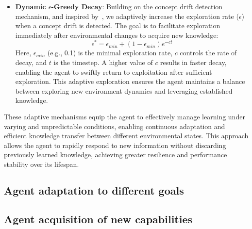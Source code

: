 \begin{itemize}
    \item \textbf{Dynamic $\epsilon$-Greedy Decay}: Building on the concept drift detection mechanism, and inspired by~\citet{mignon2017adaptive}, we adaptively increase the exploration rate ($\epsilon$) when a concept drift is detected. The goal is to facilitate exploration immediately after environmental changes to acquire new knowledge:
    \begin{equation}
        \label{eq:epsilon_greedy}
        \epsilon^* = \epsilon_{min} + (1-\epsilon_{min}) e^{-ct}
    \end{equation}
    Here, $\epsilon_{min}$ (e.g., 0.1) is the minimal exploration rate, $c$ controls the rate of decay, and $t$ is the timestep. A higher value of $c$ results in faster decay, enabling the agent to swiftly return to exploitation after sufficient exploration. This adaptive exploration ensures the agent maintains a balance between exploring new environment dynamics and leveraging established knowledge.
\end{itemize}

These adaptive mechanisms equip the agent to effectively manage learning under varying and unpredictable conditions, enabling continuous adaptation and efficient knowledge transfer between different environmental states. This approach allows the agent to rapidly respond to new information without discarding previously learned knowledge, achieving greater resilience and performance stability over its lifespan.

\subsection{Agent adaptation to different goals}


\subsection{Agent acquisition of new capabilities}


\endinput

